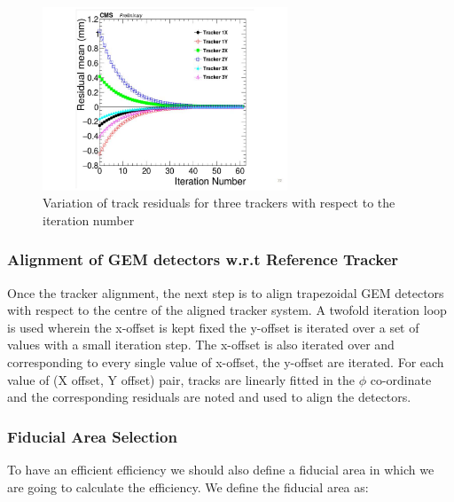 \begin{figure}[!htbp]
\centering
\includegraphics[width=0.65\textwidth]{figures/GEM/Tracker_iterative_alignment.jpg}
\caption{Variation of track residuals for three trackers with respect to the iteration number}\label{fig:alignmentIteration}
\end{figure}

\subsubsection{Alignment of GEM detectors w.r.t Reference Tracker}
Once the tracker alignment, the next step is to align trapezoidal GEM detectors with respect to the centre of the aligned tracker system.
A twofold iteration loop is used wherein the x-offset is kept fixed the y-offset is iterated over a set of values with a small iteration step.
The x-offset is also iterated over and corresponding to every single value of x-offset, the y-offset are iterated.
For each value of (X offset, Y offset) pair, tracks are linearly fitted in the $\phi$ co-ordinate and the corresponding residuals are noted and used to align the detectors.

\subsubsection{Fiducial Area Selection} %
\label{ssub:fiducial_area_selection}
To have an efficient efficiency we should also define a fiducial area in which we are going to calculate the efficiency. We define the fiducial area as:

